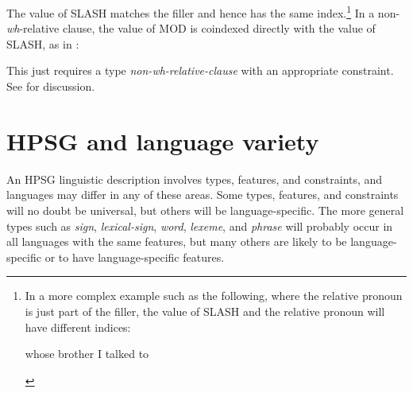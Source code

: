 \documentclass[output=paper]{langsci/langscibook}
\begin{document}
\ea\label{ex:key:4.13}
\z
%
The value of SLASH matches the filler and hence has the same index.\footnote{In
    a more complex example such as the following, where the relative pronoun is
    just part of the filler, the value of SLASH and the relative pronoun will
    have different indices:

\begin{exe}
     whose brother I talked to
\end{exe}} In a non-\emph{wh}-relative clause, the value of MOD is coindexed
directly with the value of SLASH, as in :

\ea\label{ex:key:4.14}
\z
%
This just requires a type \emph{non-wh-relative-clause} with an appropriate
constraint. See \citet{Sag1997} for discussion.

\section{HPSG and language variety}\label{sec-5:4}

An \gls{HPSG} linguistic description involves types, features, and constraints,
and languages may differ in any of these areas. Some types, features, and
constraints will no doubt be universal, but others will be language-specific.
The more general types such as \emph{sign}, \emph{lexical-sign}, \emph{word},
\emph{lexeme}, and \emph{phrase} will probably occur in all languages with the
same features, but many others are likely to be language-specific or to have
language-specific features.
\end{document}
